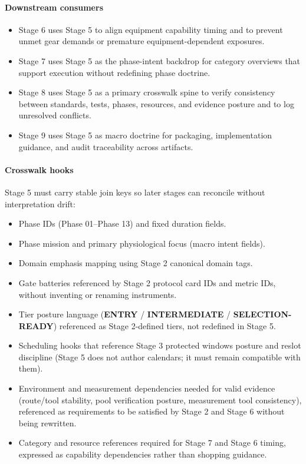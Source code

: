 \documentclass[10pt]{article}
\begin{document}
\paragraph*{Downstream consumers}

\begin{itemize}
\item Stage 6 uses Stage 5 to align equipment capability timing and to prevent unmet gear demands or premature equipment-dependent exposures.
\item Stage 7 uses Stage 5 as the phase-intent backdrop for category overviews that support execution without redefining phase doctrine.
\item Stage 8 uses Stage 5 as a primary crosswalk spine to verify consistency between standards, tests, phases, resources, and evidence posture and to log unresolved conflicts.
\item Stage 9 uses Stage 5 as macro doctrine for packaging, implementation guidance, and audit traceability across artifacts.
\end{itemize}

\paragraph*{Crosswalk hooks}

Stage 5 must carry stable join keys so later stages can reconcile without interpretation drift:

\begin{itemize}
\item Phase IDs (Phase 01–Phase 13) and fixed duration fields.
\item Phase mission and primary physiological focus (macro intent fields).
\item Domain emphasis mapping using Stage 2 canonical domain tags.
\item Gate batteries referenced by Stage 2 protocol card IDs and metric IDs, without inventing or renaming instruments.
\item Tier posture language (\textbf{ENTRY} / \textbf{INTERMEDIATE} / \textbf{SELECTION-READY}) referenced as Stage 2-defined tiers, not redefined in Stage 5.
\item Scheduling hooks that reference Stage 3 protected windows posture and reslot discipline (Stage 5 does not author calendars; it must remain compatible with them).
\item Environment and measurement dependencies needed for valid evidence (route/tool stability, pool verification posture, measurement tool consistency), referenced as requirements to be satisfied by Stage 2 and Stage 6 without being rewritten.
\item Category and resource references required for Stage 7 and Stage 6 timing, expressed as capability dependencies rather than shopping guidance.
\end{itemize}
\end{document}
